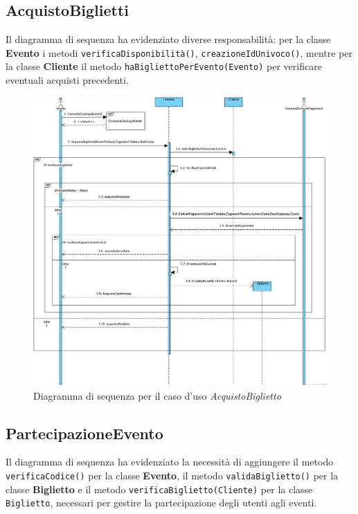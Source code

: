 \subsection{AcquistoBiglietti}

Il diagramma di sequenza ha evidenziato diverse responsabilità: per la classe \textbf{Evento} i metodi \texttt{verificaDisponibilità()}, \texttt{creazioneIdUnivoco()}, mentre per la classe \textbf{Cliente} il metodo \texttt{haBigliettoPerEvento(Evento)} per verificare eventuali acquisti precedenti.

\begin{figure}[H]
    \centering
    \includegraphics[width=0.8\linewidth]{assets/casid'uso/AcquistoBiglietto.png}
    \caption{Diagramma di sequenza per il caso d'uso \emph{AcquistoBiglietto}}
    \label{fig:acquistobiglietto}
\end{figure}


\newpage
\subsection{PartecipazioneEvento}

Il diagramma di sequenza ha evidenziato la necessità di aggiungere il metodo \texttt{verificaCodice()} per la classe \textbf{Evento}, il metodo \texttt{validaBiglietto()} per la classe \textbf{Biglietto} e il metodo \texttt{verificaBiglietto(Cliente)} per la classe \texttt{Biglietto}, necessari per gestire la partecipazione degli utenti agli eventi.

